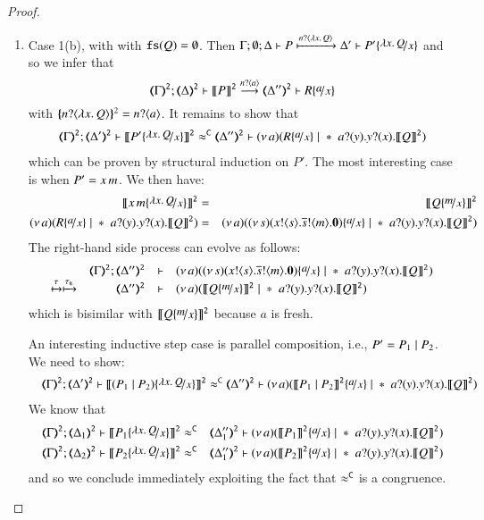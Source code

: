 \begin{proof}
\begin{enumerate}[1.]
	\item Case 1(b), with with $\mathtt{fs}(Q) =  \emptyset$. 
%
	Then
		$\Gamma; \es; \Delta \proves P \hby{\bactinp{n}{\abs{x}{Q}}} \Delta' \proves P' \subst{\abs{x}{Q}}{x}$
		and so we infer that
	\begin{equation*}
		\tmap{\Gamma}{2};  \tmap{\Delta}{2} \proves \pmap{P}{2} \by{\bactinp{n}{a}} \tmap{\Delta''}{2} \proves R \subst{a}{x}
	\end{equation*}
%
	\noi with $\{\!\!\{n ? \langle \lambda x.\,Q \rangle\}\!\!\}^{2} = n ? \langle a \rangle$.
%
	It remains to show that
%
	\begin{eqnarray*}
		\tmap{\Gamma}{2};  \tmap{\Delta'}{2} \proves \pmap{P' \subst{\abs{x}{Q}}{x}}{2} \fwb
		\tmap{\Delta''}{2} \proves \newsp{a}{R \subst{a}{x} \Par \repl{\binp{a}{y} \binp{y}{x} \pmap{Q}{2}}}
	\end{eqnarray*}
which can be proven by structural induction on $P'$.
The most interesting case is when $P' = x\, {m}$. We then have:
%
	\begin{eqnarray*}
		\pmap{\appl{x}{m} \subst{\abs{x}{Q}}{x}}{2} &=& \pmap{Q \subst{m}{x}}{2}\\
		\newsp{a}{R \subst{a}{x} \Par \repl{\binp{a}{y} \binp{y}{x} \pmap{Q}{2}}} &=& \newsp{a}{\newsp{s}{ \bout{x}{s} \bout{\dual{s}}{m} \inact} \subst{a}{x} \Par \repl{\binp{a}{y} \binp{y}{x} \pmap{Q}{2}}}
	\end{eqnarray*}
%
	\noi The right-hand side process can evolve as follows:
%
	\begin{eqnarray*}
		\mhorel{\tmap{\Gamma}{2}}{\tmap{\Delta''}{2}}{\newsp{a}{\newsp{s}{ \bout{x}{s} \bout{\dual{s}}{m} \inact} \subst{a}{x} \Par \repl{\binp{a}{y} \binp{y}{x} \pmap{Q}{2}}}}
		{\hby{\tau} \hby{\stau}}
		{\tmap{\Delta''}{2}}{}{\newsp{a}{\pmap{Q \subst{m}{x}}{2} \Par \repl{\binp{a}{y} \binp{y}{x} \pmap{Q}{2}}}}
	\end{eqnarray*}
%
	\noi which is bisimilar with		$\pmap{Q \subst{m}{x}}{2}$ because $a$ is fresh.

	\noi An interesting inductive step case is parallel composition, i.e., $P' = P_1 \;|\; P_2$. We need to show:
%
	\begin{eqnarray*}
		&& \tmap{\Gamma}{2};   \tmap{\Delta'}{2} \proves \pmap{(P_1 \Par P_2) \subst{\abs{x}{Q}}{x}}{2} \fwb
		\tmap{\Delta''}{2} \proves \newsp{a}{\pmap{P_1 \Par P_2}{2} \subst{a}{x} \Par \repl{\binp{a}{y} \binp{y}{x} \pmap{Q}{2}}}
	\end{eqnarray*}
%
	\noi We know that
%
	\begin{eqnarray*}
		\horel{\tmap{\Gamma}{2}}{\tmap{\Delta_1}{2}}{\pmap{P_1\subst{\abs{x}{Q}}{x}}{2}}{&\fwb&}
		{\tmap{\Delta_1''}{2}}{\newsp{a}{\pmap{P_1}{2} \subst{a}{x} \Par \repl{\binp{a}{y} \binp{y}{x} \pmap{Q}{2}}}}\\
		\horel{\tmap{\Gamma}{2}}{\tmap{\Delta_2}{2}}{\pmap{P_2\subst{\abs{x}{Q}}{x}}{2}}{&\fwb&}
		{\tmap{\Delta_1''}{2}}{\newsp{a}{\pmap{P_2}{2} \subst{a}{x} \Par \repl{\binp{a}{y} \binp{y}{x} \pmap{Q}{2}}}}
	\end{eqnarray*}
%
	\noi and so we conclude immediately exploiting the fact that $\approx^\mathtt{C}$ is a congruence.


\end{enumerate}
\end{proof}
